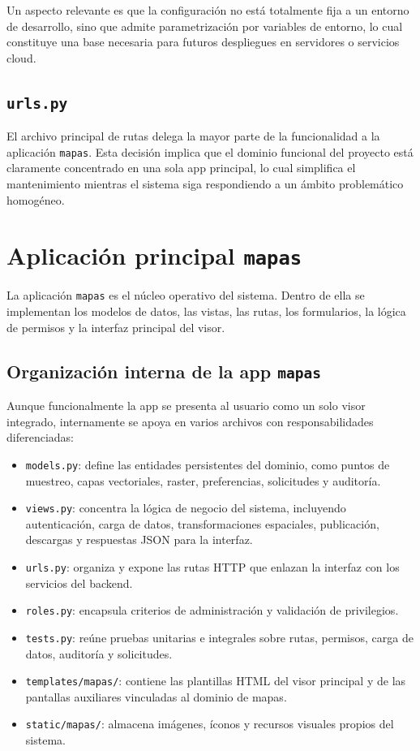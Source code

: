 \documentclass[12pt,a4paper]{report}
\begin{document}
Un aspecto relevante es que la configuraci\'on no est\'a totalmente fija a un entorno de desarrollo, sino que admite parametrizaci\'on por variables de entorno, lo cual constituye una base necesaria para futuros despliegues en servidores o servicios cloud.

\subsection{\texttt{urls.py}}

El archivo principal de rutas delega la mayor parte de la funcionalidad a la aplicaci\'on \texttt{mapas}. Esta decisi\'on implica que el dominio funcional del proyecto est\'a claramente concentrado en una sola app principal, lo cual simplifica el mantenimiento mientras el sistema siga respondiendo a un \'ambito problem\'atico homog\'eneo.

\section{Aplicaci\'on principal \texttt{mapas}}

La aplicaci\'on \texttt{mapas} es el n\'ucleo operativo del sistema. Dentro de ella se implementan los modelos de datos, las vistas, las rutas, los formularios, la l\'ogica de permisos y la interfaz principal del visor.

\subsection{Organizaci\'on interna de la app \texttt{mapas}}

Aunque funcionalmente la app se presenta al usuario como un solo visor integrado, internamente se apoya en varios archivos con responsabilidades diferenciadas:

\begin{itemize}
    \item \texttt{models.py}: define las entidades persistentes del dominio, como puntos de muestreo, capas vectoriales, raster, preferencias, solicitudes y auditor\'ia.
    \item \texttt{views.py}: concentra la l\'ogica de negocio del sistema, incluyendo autenticaci\'on, carga de datos, transformaciones espaciales, publicaci\'on, descargas y respuestas JSON para la interfaz.
    \item \texttt{urls.py}: organiza y expone las rutas HTTP que enlazan la interfaz con los servicios del backend.
    \item \texttt{roles.py}: encapsula criterios de administraci\'on y validaci\'on de privilegios.
    \item \texttt{tests.py}: re\'une pruebas unitarias e integrales sobre rutas, permisos, carga de datos, auditor\'ia y solicitudes.
    \item \texttt{templates/mapas/}: contiene las plantillas HTML del visor principal y de las pantallas auxiliares vinculadas al dominio de mapas.
    \item \texttt{static/mapas/}: almacena im\'agenes, \'iconos y recursos visuales propios del sistema.
\end{itemize}
\end{document}

